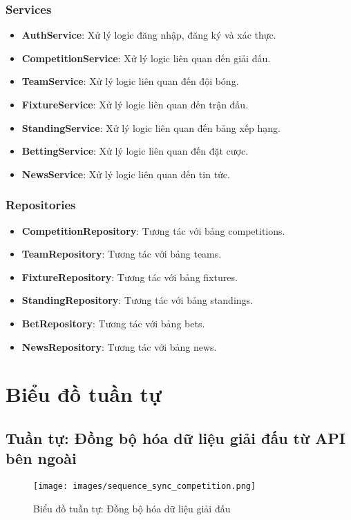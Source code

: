 \documentclass[a4paper,12pt]{report}
\begin{document}
\subsubsection{Services}
\begin{itemize}
    \item \textbf{AuthService}: Xử lý logic đăng nhập, đăng ký và xác thực.
    \item \textbf{CompetitionService}: Xử lý logic liên quan đến giải đấu.
    \item \textbf{TeamService}: Xử lý logic liên quan đến đội bóng.
    \item \textbf{FixtureService}: Xử lý logic liên quan đến trận đấu.
    \item \textbf{StandingService}: Xử lý logic liên quan đến bảng xếp hạng.
    \item \textbf{BettingService}: Xử lý logic liên quan đến đặt cược.
    \item \textbf{NewsService}: Xử lý logic liên quan đến tin tức.
\end{itemize}

\subsubsection{Repositories}
\begin{itemize}
    \item \textbf{CompetitionRepository}: Tương tác với bảng competitions.
    \item \textbf{TeamRepository}: Tương tác với bảng teams.
    \item \textbf{FixtureRepository}: Tương tác với bảng fixtures.
    \item \textbf{StandingRepository}: Tương tác với bảng standings.
    \item \textbf{BetRepository}: Tương tác với bảng bets.
    \item \textbf{NewsRepository}: Tương tác với bảng news.
\end{itemize}

\section{Biểu đồ tuần tự}

\subsection{Tuần tự: Đồng bộ hóa dữ liệu giải đấu từ API bên ngoài}

\begin{figure}[H]
\centering
\texttt{[image: images/sequence\_sync\_competition.png]}
\caption{Biểu đồ tuần tự: Đồng bộ hóa dữ liệu giải đấu}
\label{fig:sequence-sync-competition}
\end{figure}
\end{document}
